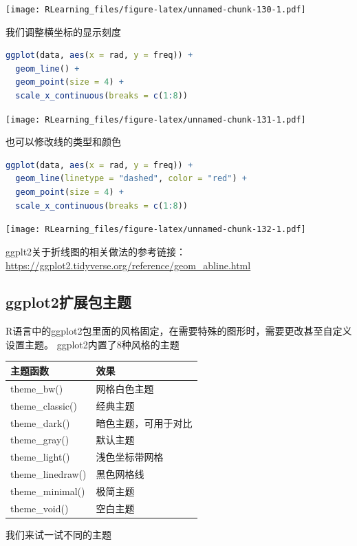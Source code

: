 \documentclass[]{ctexbook}
\begin{document}
\texttt{[image: RLearning\_files/figure-latex/unnamed-chunk-130-1.pdf]}

我们调整横坐标的显示刻度

\begin{lstlisting}[language=R]
ggplot(data, aes(x = rad, y = freq)) +
  geom_line() +
  geom_point(size = 4) +
  scale_x_continuous(breaks = c(1:8))
\end{lstlisting}

\texttt{[image: RLearning\_files/figure-latex/unnamed-chunk-131-1.pdf]}

也可以修改线的类型和颜色

\begin{lstlisting}[language=R]
ggplot(data, aes(x = rad, y = freq)) +
  geom_line(linetype = "dashed", color = "red") +
  geom_point(size = 4) +
  scale_x_continuous(breaks = c(1:8))
\end{lstlisting}

\texttt{[image: RLearning\_files/figure-latex/unnamed-chunk-132-1.pdf]}

ggplt2关于折线图的相关做法的参考链接：
\url{https://ggplot2.tidyverse.org/reference/geom_abline.html}

\hypertarget{ggplot2ux6269ux5c55ux5305ux4e3bux9898}{%
\subsection{ggplot2扩展包主题}\label{ggplot2ux6269ux5c55ux5305ux4e3bux9898}}

R语言中的ggplot2包里面的风格固定，在需要特殊的图形时，需要更改甚至自定义设置主题。
ggplot2内置了8种风格的主题

\begin{longtable}[]{@{}ll@{}}
\toprule
主题函数 & 效果 \\
\midrule
\endhead
theme\_bw() & 网格白色主题 \\
theme\_classic() & 经典主题 \\
theme\_dark() & 暗色主题，可用于对比 \\
theme\_gray() & 默认主题 \\
theme\_light() & 浅色坐标带网格 \\
theme\_linedraw() & 黑色网格线 \\
theme\_minimal() & 极简主题 \\
theme\_void() & 空白主题 \\
\bottomrule
\end{longtable}

我们来试一试不同的主题
\end{document}
